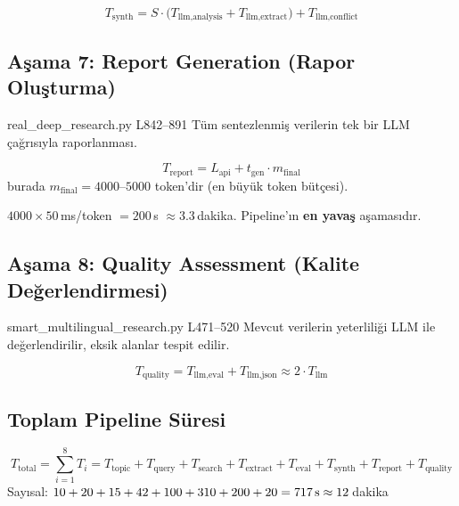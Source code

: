 \begin{equation}
\label{eq:synthesis_time}
T_{\text{synth}} = S \cdot \bigl(T_{\text{llm,analysis}} + T_{\text{llm,extract}}\bigr) + T_{\text{llm,conflict}}
\end{equation}

\subsection{A\c{s}ama 7: Report Generation (Rapor Olu\c{s}turma)}

\begin{kodref}{real\_deep\_research.py L842--891}
T\"{u}m sentezlenmi\c{s} verilerin tek bir LLM \c{c}a\u{g}r{\i}s{\i}yla raporlanmas{\i}.
\end{kodref}

\begin{equation}
\label{eq:report_time}
T_{\text{report}} = L_{\text{api}} + t_{\text{gen}} \cdot m_{\text{final}}
\end{equation}
burada $m_{\text{final}} = 4000$--$5000$ token'dir (en b\"{u}y\"{u}k token b\"{u}t\c{c}esi).

\begin{ornek}
$4000 \times 50$\,ms/token $= 200$\,s $\approx 3.3$\,dakika. Pipeline'{\i}n \textbf{en yava\c{s}} a\c{s}amas{\i}d{\i}r.
\end{ornek}

\subsection{A\c{s}ama 8: Quality Assessment (Kalite De\u{g}erlendirmesi)}

\begin{kodref}{smart\_multilingual\_research.py L471--520}
Mevcut verilerin yeterlili\u{g}i LLM ile de\u{g}erlendirilir, eksik alanlar tespit edilir.
\end{kodref}

\begin{equation}
\label{eq:quality_time}
T_{\text{quality}} = T_{\text{llm,eval}} + T_{\text{llm,json}} \approx 2 \cdot T_{\text{llm}}
\end{equation}

\subsection{Toplam Pipeline S\"{u}resi}

\begin{formulbox}
\begin{equation}
\label{eq:total_pipeline}
T_{\text{total}} = \sum_{i=1}^{8} T_{i} = T_{\text{topic}} + T_{\text{query}} + T_{\text{search}} + T_{\text{extract}} + T_{\text{eval}} + T_{\text{synth}} + T_{\text{report}} + T_{\text{quality}}
\end{equation}
Say{\i}sal: $10 + 20 + 15 + 42 + 100 + 310 + 200 + 20 = 717\text{\,s} \approx 12$\,dakika
\end{formulbox}


